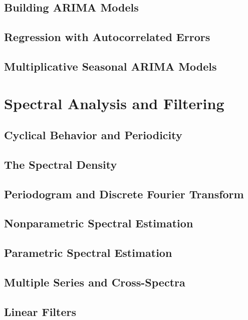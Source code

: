\documentclass[12pt]{article}
\begin{document}
\subsection{Building ARIMA Models}

\subsection{Regression with Autocorrelated Errors}

\subsection{Multiplicative Seasonal ARIMA Models}


\section{Spectral Analysis and Filtering}
\subsection{Cyclical Behavior and Periodicity}

\subsection{The Spectral Density}

\subsection{Periodogram and Discrete Fourier Transform}

\subsection{Nonparametric Spectral Estimation}

\subsection{Parametric Spectral Estimation}

\subsection{Multiple Series and Cross-Spectra}

\subsection{Linear Filters}
\end{document}
